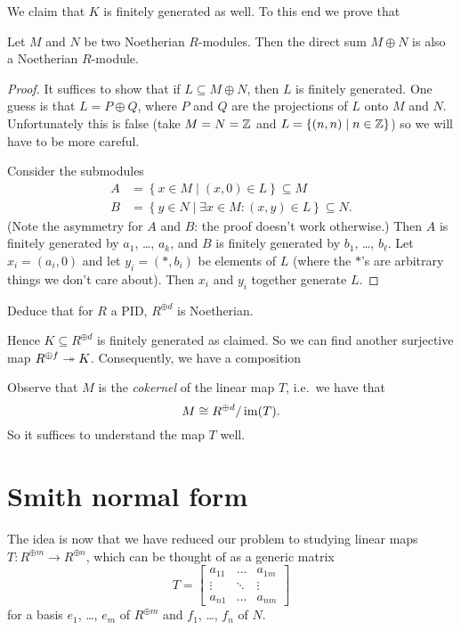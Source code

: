 We claim that $K$ is finitely generated as well.
To this end we prove that
\begin{lemma}
	Let $M$ and $N$ be two Noetherian $R$-modules.
	Then the direct sum $M \oplus N$ is also a Noetherian $R$-module.
\end{lemma}
\begin{proof}
	It suffices to show that if $L \subseteq M \oplus N$,
	then $L$ is finitely generated.
	One guess is that $L = P \oplus Q$,
	where $P$ and $Q$ are the projections of $L$ onto $M$ and $N$.
	Unfortunately this is false
	(take $M = N = \mathbb Z$ and $L = \{(n,n) \mid n \in \mathbb Z\}$)
	so we will have to be more careful.

	Consider the submodules
	\begin{align*}
		A &= \left\{ x \in M \mid (x,0) \in L \right\} \subseteq M \\
		B &= \left\{ y \in N \mid \exists x \in M : (x,y) \in L \right\}
			\subseteq N.
	\end{align*}
	(Note the asymmetry for $A$ and $B$: the proof doesn't work otherwise.)
	Then $A$ is finitely generated by $a_1$, \dots, $a_k$,
	and $B$ is finitely generated by $b_1$, \dots, $b_\ell$.
	Let $x_i = (a_i, 0)$ and let $y_i = (\ast, b_i)$ be elements of $L$
	(where the $\ast$'s are arbitrary things we don't care about).
	Then $x_i$ and $y_i$ together generate $L$.
\end{proof}
\begin{ques}
	Deduce that for $R$ a PID, $R^{\oplus d}$ is Noetherian.
\end{ques}
Hence $K \subseteq R^{\oplus d}$ is finitely generated as claimed.
So we can find another surjective map $R^{\oplus f} \twoheadrightarrow K$.
Consequently, we have a composition
\begin{center}
\end{center}
Observe that $M$ is the \emph{cokernel} of the linear map $T$,
i.e.\ we have that
\[ M \cong R^{\oplus d} / \operatorname{im}(T). \]
So it suffices to understand the map $T$ well.

\section{Smith normal form}
The idea is now that we have reduced our problem to studying
linear maps $T \colon R^{\oplus m} \to R^{\oplus n}$,
which can be thought of as a generic matrix
\[ T = \begin{bmatrix}
		a_{11} & \dots & a_{1m} \\
		\vdots & \ddots & \vdots \\
		a_{n1} & \dots & a_{nm}
	\end{bmatrix} \]
for a basis $e_1$, \dots, $e_m$ of $R^{\oplus m}$
and $f_1$, \dots, $f_n$ of $N$.

